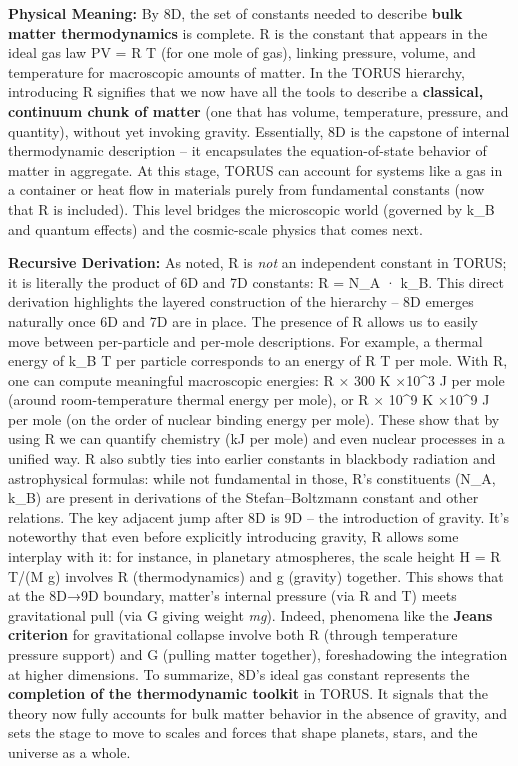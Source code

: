 \documentclass[
]{article}
\begin{document}
\textbf{Physical Meaning:} By 8D, the set of constants needed to
describe \textbf{bulk matter thermodynamics} is complete. R is the
constant that appears in the ideal gas law PV = R T (for one mole of
gas), linking pressure, volume, and temperature for macroscopic amounts
of matter\hspace{0pt}. In the TORUS hierarchy, introducing R signifies
that we now have all the tools to describe a \textbf{classical,
continuum chunk of matter} (one that has volume, temperature, pressure,
and quantity), without yet invoking gravity. Essentially, 8D is the
capstone of internal thermodynamic description -- it encapsulates the
equation-of-state behavior of matter in aggregate. At this stage, TORUS
can account for systems like a gas in a container or heat flow in
materials purely from fundamental constants (now that R is included).
This level bridges the microscopic world (governed by k\_B and quantum
effects) and the cosmic-scale physics that comes next.

\textbf{Recursive Derivation:} As noted, R is \emph{not} an independent
constant in TORUS; it is literally the product of 6D and 7D constants: R
= N\_A · k\_B\hspace{0pt}. This direct derivation highlights the layered
construction of the hierarchy -- 8D emerges naturally once 6D and 7D are
in place. The presence of R allows us to easily move between
per-particle and per-mole descriptions. For example, a thermal energy of
k\_B T per particle corresponds to an energy of R T per mole. With R,
one can compute meaningful macroscopic energies: R × 300 K ×10\^{}3
J per mole (around room-temperature thermal energy per mole), or R ×
10\^{}9 K ×10\^{}9 J per mole (on the order of nuclear binding
energy per mole)\hspace{0pt}. These show that by using R we can quantify
chemistry (kJ per mole) and even nuclear processes in a unified way. R
also subtly ties into earlier constants in blackbody radiation and
astrophysical formulas: while not fundamental in those, R's constituents
(N\_A, k\_B) are present in derivations of the Stefan--Boltzmann
constant and other relations\hspace{0pt}. The key adjacent jump after 8D
is 9D -- the introduction of gravity. It's noteworthy that even before
explicitly introducing gravity, R allows some interplay with it: for
instance, in planetary atmospheres, the scale height H = R T/(M g)
involves R (thermodynamics) and g (gravity) together\hspace{0pt}. This
shows that at the 8D→9D boundary, matter's internal pressure (via R and
T) meets gravitational pull (via G giving weight \emph{mg}). Indeed,
phenomena like the \textbf{Jeans criterion} for gravitational collapse
involve both R (through temperature pressure support) and G (pulling
matter together), foreshadowing the integration at higher dimensions. To
summarize, 8D's ideal gas constant represents the \textbf{completion of
the thermodynamic toolkit} in TORUS. It signals that the theory now
fully accounts for bulk matter behavior in the absence of gravity, and
sets the stage to move to scales and forces that shape planets, stars,
and the universe as a whole.
\end{document}
